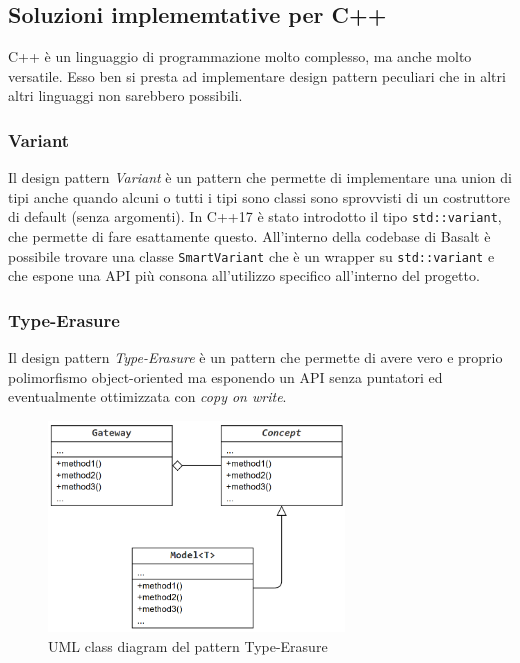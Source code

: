 \subsection{Soluzioni implememtative per C++}
C++ è un linguaggio di programmazione molto complesso, ma anche molto versatile. Esso ben si presta 
ad implementare design pattern peculiari che in altri altri linguaggi non sarebbero possibili.

\subsubsection{Variant}
Il design pattern \textit{Variant} è un pattern che permette di implementare una union di tipi anche 
quando alcuni o tutti i tipi sono classi sono sprovvisti di un costruttore di default (senza argomenti).
In C++17 è stato introdotto il tipo \texttt{std::variant}, che permette di fare esattamente questo. All'interno 
della codebase di Basalt è possibile trovare una classe \texttt{SmartVariant} che è un wrapper su \texttt{std::variant}
e che espone una API più consona all'utilizzo specifico all'interno del progetto. \\

\subsubsection{Type-Erasure}
Il design pattern \textit{Type-Erasure} è un pattern che permette di avere vero e proprio polimorfismo 
object-oriented ma esponendo un API senza puntatori ed eventualmente ottimizzata con \textit{copy on write}.

\begin{figure}[H]
    \centering
        \includegraphics[width=0.7\textwidth]{../../Assets/TypeErasure.png}
    \caption{UML class diagram del pattern Type-Erasure}
\end{figure}

